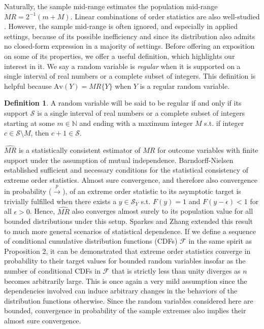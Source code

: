\documentclass[12pt]{amsart}
\theoremstyle{plain}%
\theoremstyle{definition}
\newtheorem{definition}{Definition}
\theoremstyle{remark}
\numberwithin{equation}{section}
\begin{document}
Naturally, the sample mid-range estimates the population mid-range $MR=2^{-1}(m + M)$. Linear combinations of order statistics are also well-studied \cite{chernoff1967asymptotic, hosking1990moments, bickel1973some, david2004order}. However, the sample mid-range is often ignored, and especially in applied settings, because of its possible inefficiency and since its distribution also admits no closed-form expression in a majority of settings. Before offering an exposition on some of its properties, we offer a useful definition, which highlights our interest in it. We say a random variable is \textit{regular} when it is supported on a single interval of real numbers or a complete subset of integers. This definition is helpful because $\text{Av}(Y) = MR \{Y \}$ when $Y$ is a regular random variable. 
\begin{definition}
A random variable will be said to be regular if and only if its support $\mathcal{S}$ is a single interval of real numbers or a complete subset of integers starting at some $m \in \mathbb{N}$ and ending with a maximum integer $M$ s.t. if integer $c \in \mathcal{S} \setminus{M}$, then $c+1 \in \mathcal{S}$.
\end{definition}
$\hat{MR}$ is a statistically consistent estimator of $MR$ for outcome variables with finite support under the assumption of mutual independence. Barndorff-Nielsen \cite{barndorff1963limit} established sufficient and necessary conditions for the statistical consistency of extreme order statistics. Almost sure convergence, and therefore also convergence in probability ($\overset{p}{\to}$), of an extreme order statistic to its asymptotic target is trivially fulfilled when there exists a $y \in \mathcal{S}_Y$ s.t. $F(y)=1$ and $F(y - \epsilon) < 1$ for all $\epsilon > 0$. Hence, $\hat{MR}$ also converges almost surely to its population value for all bounded distributions under this setup. Sparkes and Zhang \cite{u2023properties} extended this result to much more general scenarios of statistical dependence. If we define a sequence of conditional cumulative distribution functions (CDFs) $\mathcal{F}$ in the same spirit as Proposition 2, it can be demonstrated that extreme order statistics converge in probability to their target values for bounded random variables insofar as the number of conditional CDFs in $\mathcal{F}$ that is strictly less than unity diverges as $n$ becomes arbitrarily large. This is once again a very mild assumption since the dependencies involved can induce arbitrary changes in the behaviors of the distribution functions otherwise. Since the random variables considered here are bounded, convergence in probability of the sample extremes also implies their almost sure convergence.
\end{document}
